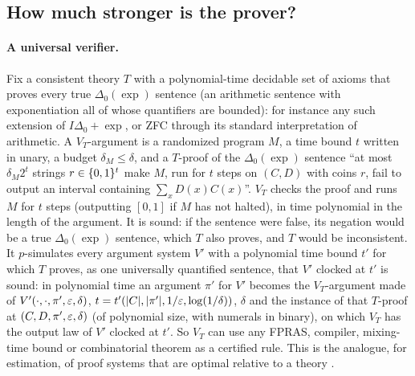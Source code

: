 \subsection{How much stronger is the prover?}\label{sec:separations}

\paragraph{A universal verifier.} Fix a consistent theory $T$ with a
polynomial-time decidable set of axioms that proves every true $\Delta_0(\exp)$
sentence (an arithmetic sentence with exponentiation all of whose quantifiers are
bounded): for instance any such extension of $I\Delta_0+\exp$, or ZFC through its
standard interpretation of arithmetic. A $V_T$-argument is a randomized program $M$,
a time bound $t$ written in unary, a budget $\delta_M\le\delta$, and a $T$-proof of the
$\Delta_0(\exp)$ sentence ``at most $\delta_M2^t$ strings $r\in\{0,1\}^t$ make $M$,
run for $t$ steps on $(C,D)$ with coins $r$, fail to output an interval containing
$\sum_xD(x)C(x)$''. $V_T$ checks the proof and runs $M$ for $t$ steps (outputting
$[0,1]$ if $M$ has not halted), in time polynomial in the length of the argument.
It is sound: if the sentence were false, its negation would be a true
$\Delta_0(\exp)$ sentence, which $T$ also proves, and $T$ would be inconsistent. It
$p$-simulates every argument system $V'$ with a polynomial time bound $t'$ for which
$T$ proves, as one universally quantified sentence, that $V'$ clocked at $t'$ is
sound: in polynomial time an argument $\pi'$ for $V'$ becomes the $V_T$-argument made
of $V'(\cdot,\cdot,\pi',\varepsilon,\delta)$, $t=t'(|C|,|\pi'|,1/\varepsilon,\log(1/\delta))$, $\delta$
and the instance of that $T$-proof at $(C,D,\pi',\varepsilon,\delta)$ (of polynomial size,
with numerals in binary), on which
$V_T$ has the output law of $V'$ clocked at $t'$. So $V_T$ can use any FPRAS,
compiler, mixing-time bound or combinatorial theorem as a certified rule. This is
the analogue, for estimation, of proof systems that are optimal relative to a
theory \cite{kp1989}.

